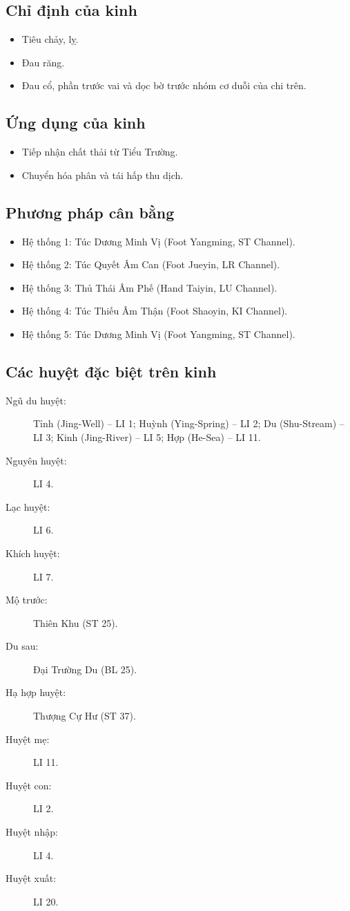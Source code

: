 \documentclass[12pt,a4paper]{article}
\begin{document}
\subsection*{Chỉ định của kinh}
\begin{itemize}
  \item Tiêu chảy, lỵ.
  \item Đau răng.
  \item Đau cổ, phần trước vai và dọc bờ trước nhóm cơ duỗi của chi trên.
\end{itemize}

\subsection*{Ứng dụng của kinh}
\begin{itemize}
  \item Tiếp nhận chất thải từ Tiểu Trường.
  \item Chuyển hóa phân và tái hấp thu dịch.
\end{itemize}

\subsection*{Phương pháp cân bằng}
\begin{itemize}
  \item Hệ thống 1: Túc Dương Minh Vị (Foot Yangming, ST Channel).
  \item Hệ thống 2: Túc Quyết Âm Can (Foot Jueyin, LR Channel).
  \item Hệ thống 3: Thủ Thái Âm Phế (Hand Taiyin, LU Channel).
  \item Hệ thống 4: Túc Thiếu Âm Thận (Foot Shaoyin, KI Channel).
  \item Hệ thống 5: Túc Dương Minh Vị (Foot Yangming, ST Channel).
\end{itemize}

\subsection*{Các huyệt đặc biệt trên kinh}
\begin{description}
  \item[Ngũ du huyệt:] Tỉnh (Jing-Well) -- LI 1; Huỳnh (Ying-Spring) -- LI 2; Du (Shu-Stream) -- LI 3; Kinh (Jing-River) -- LI 5; Hợp (He-Sea) -- LI 11.
  \item[Nguyên huyệt:] LI 4.
  \item[Lạc huyệt:] LI 6.
  \item[Khích huyệt:] LI 7.
  \item[Mộ trước:] Thiên Khu (ST 25).
  \item[Du sau:] Đại Trường Du (BL 25).
  \item[Hạ hợp huyệt:] Thượng Cự Hư (ST 37).
  \item[Huyệt mẹ:] LI 11.
  \item[Huyệt con:] LI 2.
  \item[Huyệt nhập:] LI 4.
  \item[Huyệt xuất:] LI 20.
\end{description}
\end{document}
